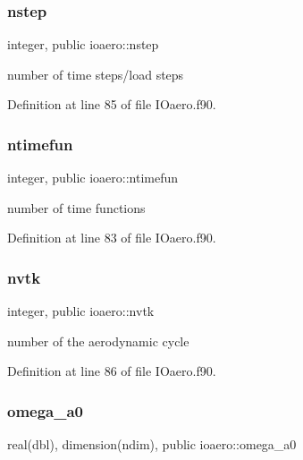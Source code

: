 \mbox{\label{namespaceioaero_ab078a397454a22b07a19ae3a7443a561}} 
\subsubsection{\texorpdfstring{nstep}{nstep}}
{\footnotesize\ttfamily integer, public ioaero\+::nstep}



number of time steps/load steps 



Definition at line 85 of file I\+Oaero.\+f90.

\mbox{\label{namespaceioaero_a8d0cfe1f4a5677d76ba3f3e775b12d1e}} 
\subsubsection{\texorpdfstring{ntimefun}{ntimefun}}
{\footnotesize\ttfamily integer, public ioaero\+::ntimefun}



number of time functions 



Definition at line 83 of file I\+Oaero.\+f90.

\mbox{\label{namespaceioaero_a29c506d8ad3a3609366b35e7e4c00fa4}} 
\subsubsection{\texorpdfstring{nvtk}{nvtk}}
{\footnotesize\ttfamily integer, public ioaero\+::nvtk}



number of the aerodynamic cycle 



Definition at line 86 of file I\+Oaero.\+f90.

\mbox{\label{namespaceioaero_a38fc5ef87ae7c2e312ad32f857e791cb}} 
\subsubsection{\texorpdfstring{omega\+\_\+a0}{omega\_a0}}
{\footnotesize\ttfamily real(dbl), dimension(ndim), public ioaero\+::omega\+\_\+a0}



